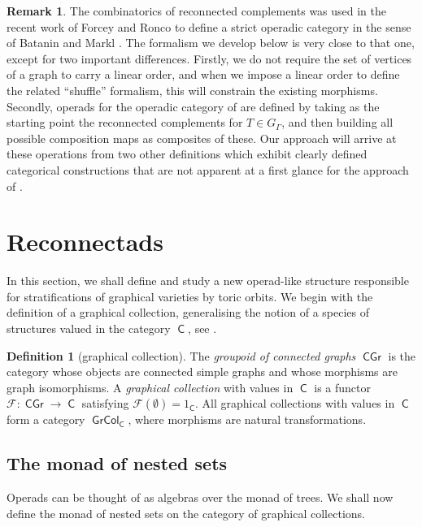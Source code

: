 \documentclass[11pt]{article}
\theoremstyle{definition}
\newtheorem{defi}[theo]{Definition}
\newtheorem{rema}[theo]{Remark}
\numberwithin{equation}{section}
\newcommand\calF{\mathcal{F}}
\DeclareMathOperator{\sfC}{\mathsf{C}}
\DeclareMathOperator{\CGr}{\mathsf{CGr}}
\DeclareMathOperator{\GrCol}{\mathsf{GrCol}}
\begin{document}
\begin{rema}
The combinatorics of reconnected complements was used in the recent work of Forcey and Ronco \cite{jlms.12596} to define a strict operadic category in the sense of Batanin and Markl \cite{MR3406537}. The formalism we develop below is very close to that one, except for two important differences. Firstly, we do not require the set of vertices of a graph to carry a linear order, and when we impose a linear order to define the related ``shuffle'' formalism, this will constrain the existing morphisms. Secondly, operads for the operadic category of \cite{jlms.12596} are defined by taking as the starting point the reconnected complements for $T\in G_\Gamma$, and then building all possible composition maps as composites of these. Our approach will arrive at these operations from two other definitions which exhibit clearly defined categorical constructions that are not apparent at a first glance for the approach of \cite{jlms.12596}.
\end{rema}

\section{Reconnectads}\label{sec:reconnectads}

In this section, we shall define and study a new operad-like structure responsible for stratifications of graphical varieties by toric orbits. We begin with the definition of a graphical collection, generalising the notion of a species of structures valued in the category $\sfC$, see \cite{MR1629341,MR633783}.

\begin{defi}[graphical collection]
The \emph{groupoid of connected graphs} $\CGr$ is the category whose objects are connected simple graphs and whose morphisms are graph isomorphisms.
A \emph{graphical collection} with values in $\sfC$ is a functor $\calF\colon \CGr\to\sfC$ satisfying $\calF(\emptyset)=1_{\sfC}$. All graphical collections with values in $\sfC$ form a category $\GrCol_{\sfC}$, where morphisms are natural transformations. 
\end{defi}

\subsection{The monad of nested sets}

Operads can be thought of as algebras over the monad of trees. We shall now define the monad of nested sets on the category of graphical collections. 
\end{document}
